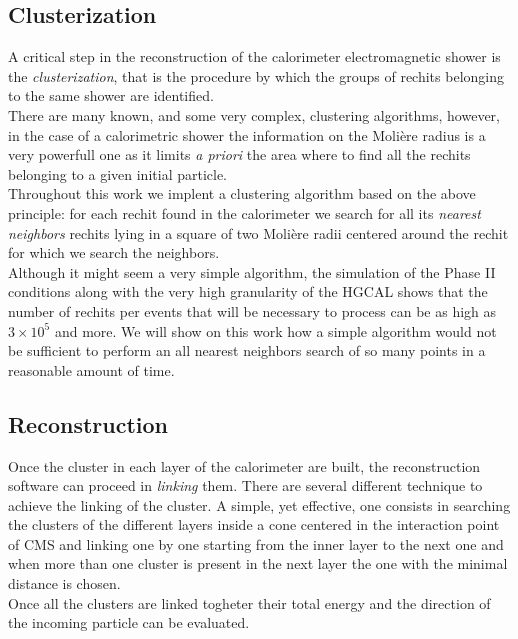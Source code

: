 \subsection{Clusterization}
A critical step in the reconstruction of the calorimeter electromagnetic shower is the \textit{clusterization}, that is the procedure by which the groups of rechits belonging to the same shower are identified.\\
There are many known, and some very complex, clustering algorithms, however, in the case of a calorimetric shower the information on the Molière radius is a very powerfull one as it limits \textit{a priori} the area where to find all the rechits belonging to a given initial particle.\\
Throughout this work we implent a clustering algorithm based on the above principle: for each rechit found in the calorimeter we search for all its \textit{nearest neighbors} rechits lying in a square of two Molière radii centered around the rechit for which we search the neighbors.\\
Although it might seem a very simple algorithm, the simulation of the Phase II conditions along with the very high granularity of the HGCAL shows that the number of rechits per events that will be necessary to process can be as high as $3 \times 10^5$ and more. We will show on this work how a simple algorithm would not be sufficient to perform an all nearest neighbors search of so many points in a reasonable amount of time.

\subsection{Reconstruction}
Once the cluster in each layer of the calorimeter are built, the reconstruction software can proceed in \textit{linking} them. There are several different technique to achieve the linking of the cluster. A simple, yet effective, one consists in searching the clusters of the different layers inside a cone centered in the interaction point of CMS and linking one by one starting from the inner layer to the next one and when more than one cluster is present in the next layer the one with the minimal distance is chosen.\\
Once all the clusters are linked togheter their total energy and the direction of the incoming particle can be evaluated.


